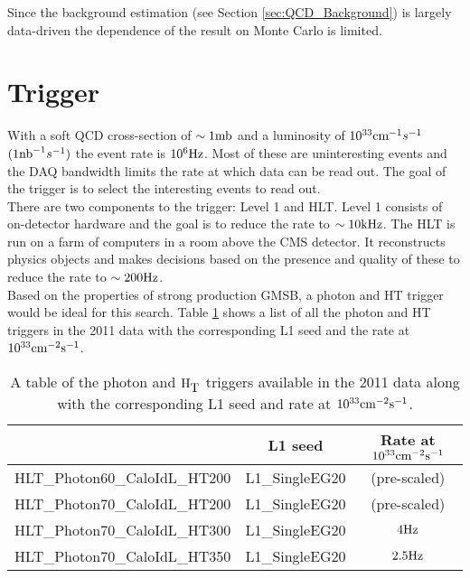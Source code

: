 
Since the background estimation (see Section \ref{sec:QCD_Background}) is 
largely data-driven the dependence of the result on Monte Carlo is limited. \\

\section{Trigger}

With a soft QCD cross-section of $\sim1\mbox{mb}$ and a luminosity of
$10^{33}\mbox{cm}^{-1}s^{-1}$ $(1\mbox{nb}^{-1} s^{-1})$ the event rate is $10^{6} \mbox{Hz}$. Most 
of these are uninteresting events and the DAQ bandwidth limits the rate at which 
data can be read out. The goal of the trigger is to select the interesting 
events to read out. \\

There are two components to the trigger: Level 1 and HLT. Level 1 consists of
on-detector hardware and the goal is to reduce the rate to $\sim 10\mbox{kHz}$. The HLT
is run on a farm of computers in a room above the CMS detector. It reconstructs
physics objects and makes decisions based on the presence and quality of these
to reduce the rate to $\sim 200\mbox{Hz}$. \\

Based on the properties of strong production GMSB, a photon and HT trigger would
be ideal for this search. Table \ref{tab:Triggers} shows a list of all the 
photon and HT triggers in the 2011 data with the corresponding L1 seed and the
rate at $10^{33}\mbox{cm}^{-2}\mbox{s}^{-1}$. \\

\begin{table}
\begin{center}
\begin{tabular}{|l|c|c|}
\hline
 & L1 seed & Rate at $10^{33}\mbox{cm}^{-2}\mbox{s}^{-1}$ \\
\hline
HLT\_Photon60\_CaloIdL\_HT200 & L1\_SingleEG20 & (pre-scaled) \\
HLT\_Photon70\_CaloIdL\_HT200 & L1\_SingleEG20 & (pre-scaled) \\
HLT\_Photon70\_CaloIdL\_HT300 & L1\_SingleEG20 & $4\mbox{Hz}$ \\
HLT\_Photon70\_CaloIdL\_HT350 & L1\_SingleEG20 & $2.5\mbox{Hz}$ \\
\hline
\end{tabular}
\end{center}
\caption{A table of the photon and $\mbox{H}_{\mbox{T}}$ triggers available in the 2011 data
along with the corresponding L1 seed and rate at $10^{33}\mbox{cm}^{-2}\mbox{s}^{-1}$.}
\label{tab:Triggers}
\end{table}

